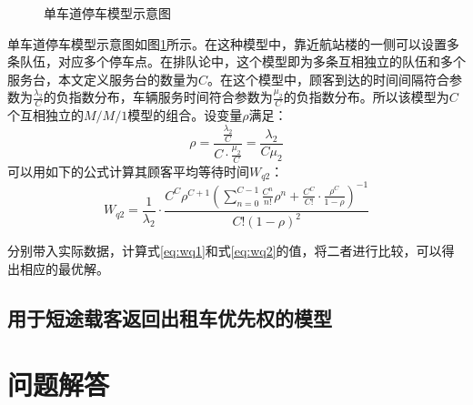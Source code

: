 \documentclass{cumcm}
\begin{document}
\begin{enumerate}[(1)]
\begin{figure}[H]
		\caption{单车道停车模型示意图}
		\label{fi:problem3single}
	\end{figure}
	单车道停车模型示意图如图\ref{fi:problem3single}所示。在这种模型中，靠近航站楼的一侧可以设置多条队伍，对应多个停车点。在排队论中，这个模型即为多条互相独立的队伍和多个服务台，本文定义服务台的数量为$C$。在这个模型中，顾客到达的时间间隔符合参数为$\frac{\lambda_2}{C}$的负指数分布，车辆服务时间符合参数为$\frac{\mu_2}{C}$的负指数分布。所以该模型为$C$个互相独立的$M/M/1$模型的组合。设变量$\rho$满足：
	\begin{equation}
		\rho=\frac{\frac{\lambda_2}{C}}{C\cdot\frac{\mu_2}{C}}=\frac{\lambda_2}{C\mu_2}
		\label{eq:rho}
	\end{equation}
	可以用如下的公式\cite{queuebook}计算其顾客平均等待时间$W_{q2}$：
	\begin{equation}
		W_{q2}=\frac{1}{\lambda_2}\cdot\frac{C^C\rho^{C+1}\left(\sum\limits_{n=0}^{C-1}\frac{C^n}{n!}\rho^n+\frac{C^C}{C!}\cdot\frac{\rho^C}{1-\rho}\right)^{-1}}{C!\left(1-\rho\right)^2}
		\label{eq:wq2}
	\end{equation}
\end{enumerate}
分别带入实际数据，计算式\ref{eq:wq1}和式\ref{eq:wq2}的值，将二者进行比较，可以得出相应的最优解。
\subsection{用于短途载客返回出租车优先权的模型}

\section{问题解答}
\end{document}
